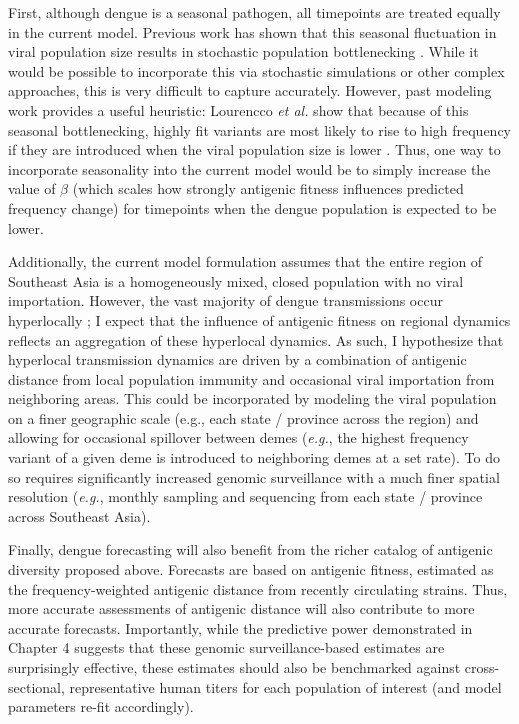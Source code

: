 First, although dengue is a seasonal pathogen, all timepoints are treated equally in the current model.
Previous work has shown that this seasonal fluctuation in viral population size results in stochastic population bottlenecking \citep{lourencco2018challenges}.
While it would be possible to incorporate this via stochastic simulations or other complex approaches, this is very difficult to capture accurately.
However, past modeling work provides a useful heuristic: Lourencco \textit{et al.} show that because of this seasonal bottlenecking, highly fit variants are most likely to rise to high frequency if they are introduced when the viral population size is lower \citep{lourencco2010viral}.
Thus, one way to incorporate seasonality into the current model would be to simply increase the value of $\beta$ (which scales how strongly antigenic fitness influences predicted frequency change) for timepoints when the dengue population is expected to be lower.

Additionally, the current model formulation assumes that the entire region of Southeast Asia is a homogeneously mixed, closed population with no viral importation.
However, the vast majority of dengue transmissions occur hyperlocally \citep{salje2017dengue}; I expect that the influence of antigenic fitness on regional dynamics reflects an aggregation of these hyperlocal dynamics.
As such, I hypothesize that hyperlocal transmission dynamics are driven by a combination of antigenic distance from local population immunity and occasional viral importation from neighboring areas.
This could be incorporated by modeling the viral population on a finer geographic scale (e.g., each state / province across the region) and allowing for occasional spillover between demes (\textit{e.g.}, the highest frequency variant of a given deme is introduced to neighboring demes at a set rate).
To do so requires significantly increased genomic surveillance with a much finer spatial resolution (\textit{e.g.}, monthly sampling and sequencing from each state / province across Southeast Asia).

Finally, dengue forecasting will also benefit from the richer catalog of antigenic diversity proposed above.
Forecasts are based on antigenic fitness, estimated as the frequency-weighted antigenic distance from recently circulating strains.
Thus, more accurate assessments of antigenic distance will also contribute to more accurate forecasts.
Importantly, while the predictive power demonstrated in Chapter 4 suggests that these genomic surveillance-based estimates are surprisingly effective, these estimates should also be benchmarked against cross-sectional, representative human titers for each population of interest (and model parameters re-fit accordingly).

